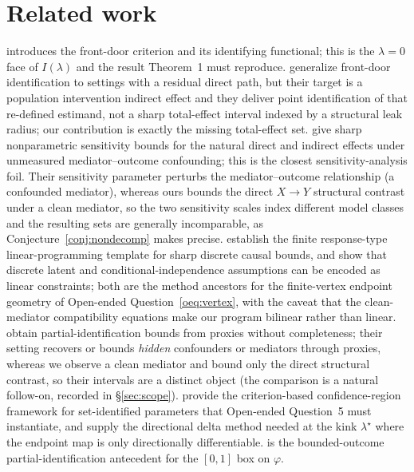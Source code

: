 \documentclass[11pt]{article}
\theoremstyle{definition}
\theoremstyle{plain}
\theoremstyle{remark}
\begin{document}
\section{Related work}
\citet{Pearl1995CausalDiagrams} introduces the front-door criterion and its identifying functional; this
is the $\lambda=0$ face of $I(\lambda)$ and the result Theorem~1 must reproduce.
\citet{FulcherShpitserMarealleTchetgen2017GeneralizedFrontDoor} generalize front-door identification to
settings with a residual direct path, but their target is a population intervention indirect effect and
they deliver point identification of that re-defined estimand, not a sharp total-effect interval indexed
by a structural leak radius; our contribution is exactly the missing total-effect set.
\citet{DingVanderWeele2016SharpMediationSensitivity} give sharp nonparametric sensitivity bounds for the
natural direct and indirect effects under unmeasured mediator--outcome confounding; this is the closest
sensitivity-analysis foil. Their sensitivity parameter perturbs the mediator--outcome relationship (a
confounded mediator), whereas ours bounds the direct $X\to Y$ structural contrast under a clean mediator,
so the two sensitivity scales index different model classes and the resulting sets are generally
incomparable, as Conjecture~\ref{conj:nondecomp} makes precise.
\citet{BalkePearl1997Bounds} establish the finite response-type linear-programming template for sharp
discrete causal bounds, and \citet{FinkelsteinAdamsSariaShpitser2020MeasurementError} show that discrete
latent and conditional-independence assumptions can be encoded as linear constraints; both are the method
ancestors for the finite-vertex endpoint geometry of Open-ended Question~\ref{oeq:vertex}, with the caveat
that the clean-mediator compatibility equations make our program bilinear rather than linear.
\citet{GhassamiShpitserTchetgen2023ProxyPartialID} obtain partial-identification bounds from proxies
without completeness; their setting recovers or bounds \emph{hidden} confounders or mediators through
proxies, whereas we observe a clean mediator and bound only the direct structural contrast, so their
intervals are a distinct object (the comparison is a natural follow-on, recorded in \S\ref{sec:scope}).
\citet{ChernozhukovHongTamer2007ParameterSets} provide the criterion-based confidence-region framework
for set-identified parameters that Open-ended Question~5 must instantiate, and
\citet{FangSantos2019DirectionallyDifferentiable} supply the directional delta method needed at the kink
$\lambda^\star$ where the endpoint map is only directionally differentiable.
\citet{Manski1990NonparametricBounds} is the bounded-outcome partial-identification antecedent for the
$[0,1]$ box on $\varphi$.
\end{document}
